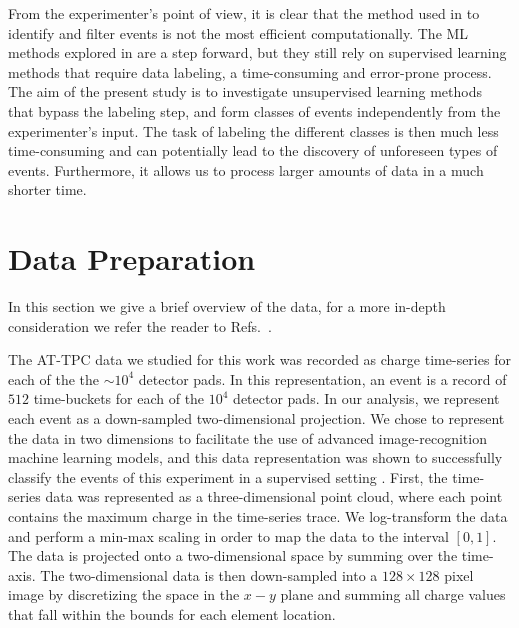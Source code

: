 \documentclass[preprint,12pt]{elsarticle}
\begin{document}
From the experimenter's point of view, it is clear that the method used in \cite{Bradt2018} to identify and filter events is not the most efficient computationally. The ML methods explored in \cite{Kuchera2019} are a step forward, but they still rely on supervised learning methods that require data labeling, a time-consuming and error-prone process. The aim of the present study is to investigate unsupervised learning methods that bypass the labeling step, and form classes of events independently from the experimenter's input. The task of labeling the different classes is then much less time-consuming and can potentially lead to the discovery of unforeseen types of events. Furthermore, it allows us to process larger amounts of data in a much shorter time. 

\section{Data Preparation}\label{sec:datadescript}

In this section we give a brief overview of the data, for a more in-depth consideration we refer the reader to Refs.~\cite{Mittig2015,Suzuki2012,Bradt2017a}. 

The AT-TPC data we studied for this work was recorded as charge time-series for each of the  the $\sim10^4$ detector pads.
In this representation, an event is a record of $512$ time-buckets for each of the $10^4$ detector pads. In our analysis, we represent each event as a down-sampled two-dimensional  projection.
We chose to represent the data in two dimensions to facilitate the use of advanced image-recognition machine learning models, and this data representation was shown to successfully classify the events of this experiment in a supervised setting \cite{Kuchera2019}.
First, the time-series data was represented as a three-dimensional  point cloud, where each point contains the maximum charge in the time-series trace. We log-transform the data and perform a min-max scaling in order to  map the data to the interval $[0, 1]$. The data is projected onto a two-dimensional  space by summing over the time-axis. The two-dimensional data is then down-sampled into a $128\times128$ pixel image by discretizing the space in the $x-y$ plane and summing all charge values that fall within the bounds for each element location.
\end{document}
